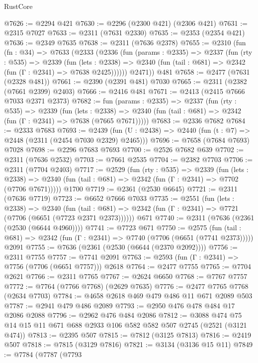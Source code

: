 \begin{lexlean}{RustCore}
\begin{coremodule}
@7626 := @2294 @421
@7630 := @2296 (@2300 @421) (@2306 @421)
@7631 := @2315 @7027
@7633 := @2311 (@7631 @2330)
@7635 := @2353 (@2354 @421)
@7636 := @2349 @7635
@7638 := @2311 (@7636 @2378)
@7655 := @2310
    (fun (fn : @34) =>
    @7633
      (@2333
        (@2336
          (fun (params : @2335) =>
          @2337
            (fun (rty : @535) =>
            @2339
              (fun (lets : @2338) =>
              @2340 (fun (tail : @681) => @2342 (fun (Γ : @2341) => @7638 @2425))))))
        @2471))
    @481
@7658 := @2477 (@7631 (@2328 @481))
@7661 := @2390 (@2391 @481) @7030
@7665 := @2311 (@2382 (@7661 @2399) @2403)
@7666 := @2416 @481
@7671 := @2413 (@2415 @7666 @7033 @2371 @2373)
@7682 := fun (params : @2335) =>
  @2337
    (fun (rty : @535) =>
    @2339
      (fun (lets : @2338) =>
      @2340 (fun (tail : @681) => @2342 (fun (Γ : @2341) => @7638 (@7665 @7671)))))
@7683 := @2336 @7682
@7684 := @2333 @7683
@7693 := @2439 (fun (U : @2438) => @2440 (fun (t : @7) => @2448 (@2311 (@2454 @7030 @2329) @2465)))
@7696 := @7658 (@7684 @7693) @7028
@7698 := @2296 @7683 @7693
@7700 := @2526 @7682 @639
@7702 := @2311 (@7636 @2532)
@7703 := @7661 @2535
@7704 := @2382 @7703
@7706 := @2311 (@7704 @2403)
@7717 := @2529
    (fun (rty : @535) =>
    @2339
      (fun (lets : @2338) =>
      @2340 (fun (tail : @681) => @2342 (fun (Γ : @2341) => @7702 (@7706 @7671)))))
    @1700
@7719 := @2361 (@2530 @6645)
@7721 := @2311 (@7636 @7719)
@7723 := @6652 @7666 @7033
@7735 := @2551
    (fun (lets : @2338) =>
    @2340
      (fun (tail : @681) => @2342 (fun (Γ : @2341) => @7721 (@7706 (@6651 (@7723 @2371 @2373))))))
    @671
@7740 := @2311 (@7636 (@2361 (@2530 (@6644 @4960))))
@7741 := @7723 @671
@7750 := @2575
    (fun (tail : @681) => @2342 (fun (Γ : @2341) => @7740 (@7706 (@6651 (@7741 @2373)))))
    @2091
@7755 := @7636 (@2361 (@2530 (@6644 (@2370 @2092))))
@7756 := @2311 @7755
@7757 := @7741 @2091
@7763 := @2593 (fun (Γ : @2341) => @7756 (@7706 (@6651 @7757))) @2618
@7764 := @2477 @7755
@7765 := @7704 @2621
@7766 := @2311 @7765
@7767 := @2624 @6650
@7768 := @7767 @7757
@7772 := @7764 (@7766 @7768) (@2629 @7635)
@7776 := @2477 @7765 @7768 (@2634 @7703)
@7784 := @4658 @2618 @469 @479 @486 @11 @671 @2089 @503
@7787 := @2941 @479 @486 @2089
@7793 := @2950 @476 @478 @484 @17 @2086 @2088
@7796 := @2962 @476 @484 @2086
@7812 := @3088 @474 @75 @14 @15 @11 @671 @688 @2933 @106 @582 @582 @507 @2745 (@2521 (@3121 @474))
@7813 := @2395 @507
@7815 := @7812 (@3125 @7813)
@7816 := @2419 @507
@7818 := @7815 (@3129 @7816)
@7821 := @3134 (@3136 @15 @11)
@7849 := @7784
    (@7787
      (@7793

\end{coremodule}
\end{lexlean}
